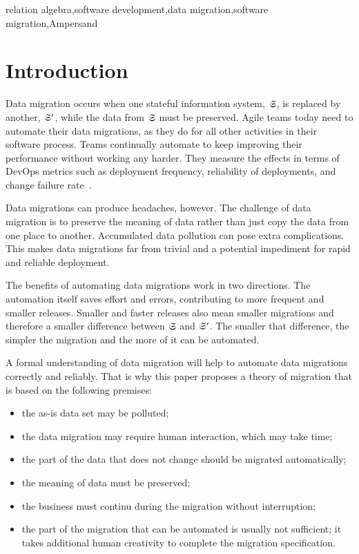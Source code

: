 \documentclass{elsarticle}
\begin{document}
\begin{keyword}
relation algebra\sep software development\sep data migration\sep software migration\sep Ampersand
\end{keyword}
\maketitle

\section{Introduction}
\label{sct:Introduction}
   Data migration occurs when one stateful information system, $\mathfrak{S}$, is replaced by another, $\mathfrak{S}'$,
   while the data from $\mathfrak{S}$ must be preserved.
   Agile teams today need to automate their data migrations, 
   as they do for all other activities in their software process.
   Teams continually automate to keep improving their performance without working any harder.
   They measure the effects in terms of DevOps metrics such as
   deployment frequency,
   reliability of deployments, and
   change failure rate~\cite{DevOps2021}.

   Data migrations can produce headaches, however.
   The challenge of data migration is to preserve the meaning of data
   rather than just copy the data from one place to another.
   Accumulated data pollution can pose extra complications.
   This makes data migrations far from trivial and a potential impediment for rapid and reliable deployment.

   The benefits of automating data migrations work in two directions.
   The automation itself saves effort and errors,
   contributing to more frequent and smaller releases.
   Smaller and faster releases also mean smaller migrations
   and therefore a smaller difference between $\mathfrak{S}$ and $\mathfrak{S}'$.
   The smaller that difference, the simpler the migration and the more of it can be automated.

   A formal understanding of data migration will help to automate data migrations correctly and reliably.
   That is why this paper proposes a theory of migration that is based on the
   following premises:
\begin{itemize}
   \item the as-is data set may be polluted;
   \item the data migration may require human interaction, which may take time;
   \item the part of the data that does not change should be migrated automatically;
   \item the meaning of data must be preserved;
   \item the business must continu during the migration without interruption;
   \item the part of the migration that can be automated is usually not sufficient;
         it takes additional human creativity to complete the migration specification.
\end{itemize}
\end{document}
